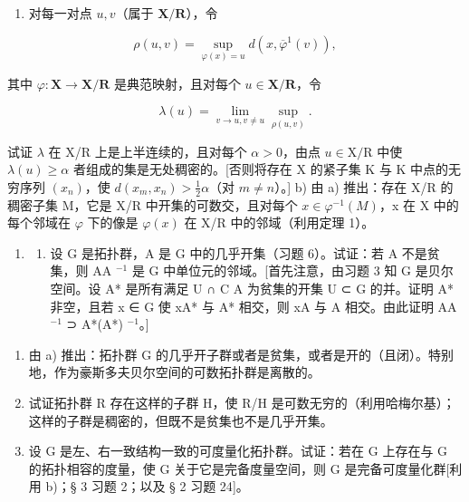 \begin{enumerate}
\def\labelenumi{\alph{enumi})}
\tightlist
\item
  对每一对点 \(u, v\)（属于 \(\mathbf{X} / \mathbf{R}\)），令
\end{enumerate}

\[
\rho (u, v) = \sup _ {\varphi (x) = u} d (x, \overline {{\varphi}} ^ {1} (v)),
\]

其中 \(\varphi : \mathbf{X} \to \mathbf{X} / \mathbf{R}\) 是典范映射，且对每个 \(u \in \mathbf{X} / \mathbf{R}\)，令

\[
\lambda (u) = \lim _ {v \rightarrow u, v \neq u} \sup _ {\rho (u, v)}.
\]

试证 \(\lambda\) 在 X/R 上是上半连续的，且对每个 \(\alpha > 0\)，由点 \(u \in \mathrm{X} / \mathrm{R}\) 中使 \(\lambda(u) \geqslant \alpha\) 者组成的集是无处稠密的。{[}否则将存在 X 的紧子集 K 与 K 中点的无穷序列 \((x_n)\)，使 \(d(x_m, x_n) > \frac{1}{2} \alpha\)（对 \(m \neq n\)）。{]} b) 由 a) 推出：存在 X/R 的稠密子集 M，它是 X/R 中开集的可数交，且对每个 \(x \in \varphi^{-1}(M)\)，x 在 X 中的每个邻域在 \(\varphi\) 下的像是 \(\varphi(x)\) 在 X/R 中的邻域（利用定理 1）。

\begin{enumerate}
\def\labelenumi{\arabic{enumi})}
\setcounter{enumi}{26}
\tightlist
\item
  \begin{enumerate}
  \def\labelenumii{\alph{enumii})}
  \tightlist
  \item
    设 G 是拓扑群，A 是 G 中的几乎开集（习题 6）。试证：若 A 不是贫集，则 AA \(^{-1}\) 是 G 中单位元的邻域。{[}首先注意，由习题 3 知 G 是贝尔空间。设 A* 是所有满足 U ∩ C A 为贫集的开集 U ⊂ G 的并。证明 A* 非空，且若 x ∈ G 使 xA* 与 A* 相交，则 xA 与 A 相交。由此证明 AA \(^{-1}\) ⊃ A*(A*) \(^{-1}\)。{]}
  \end{enumerate}
\end{enumerate}

\begin{enumerate}
\def\labelenumi{\alph{enumi})}
\setcounter{enumi}{1}
\item
  由 a) 推出：拓扑群 G 的几乎开子群或者是贫集，或者是开的（且闭）。特别地，作为豪斯多夫贝尔空间的可数拓扑群是离散的。
\item
  试证拓扑群 R 存在这样的子群 H，使 R/H 是可数无穷的（利用哈梅尔基）；这样的子群是稠密的，但既不是贫集也不是几乎开集。
\item
  设 G 是左、右一致结构一致的可度量化拓扑群。试证：若在 G 上存在与 G 的拓扑相容的度量，使 G 关于它是完备度量空间，则 G 是完备可度量化群{[}利用 b)；§ 3 习题 2；以及 § 2 习题 24{]}。
\end{enumerate}

